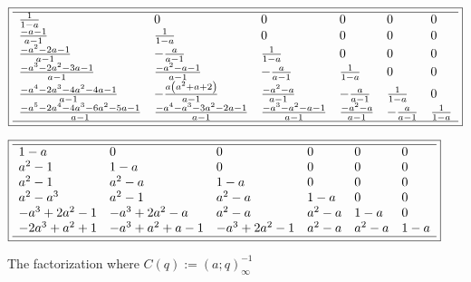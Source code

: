 \documentclass[10pt,reqno]{amsart}
\numberwithin{figure}{section}
\numberwithin{table}{section}
\theoremstyle{plain}
\numberwithin{theorem}{section}
\theoremstyle{remark}
\begin{document}
\begin{figure}[ht!]

\begin{minipage}{\linewidth} 
\begin{center} 
\small
\begin{equation*} 
\boxed{ 
\begin{array}{llllll} \hline 
 \frac{1}{1-a} & 0 & 0 & 0 & 0 & 0 \\
 \frac{-a-1}{a-1} & \frac{1}{1-a} & 0 & 0 & 0 & 0 \\
 \frac{-a^2-2 a-1}{a-1} & -\frac{a}{a-1} & \frac{1}{1-a} & 0 & 0 & 0 \\
 \frac{-a^3-2 a^2-3 a-1}{a-1} & \frac{-a^2-a-1}{a-1} & -\frac{a}{a-1} & \frac{1}{1-a} & 0 & 0 \\
 \frac{-a^4-2 a^3-4 a^2-4 a-1}{a-1} & -\frac{a \left(a^2+a+2\right)}{a-1} & \frac{-a^2-a}{a-1} & -\frac{a}{a-1} & \frac{1}{1-a} & 0 \\
 \frac{-a^5-2 a^4-4 a^3-6 a^2-5 a-1}{a-1} & \frac{-a^4-a^3-3 a^2-2 a-1}{a-1} & \frac{-a^3-a^2-a-1}{a-1} & \frac{-a^2-a}{a-1} & -\frac{a}{a-1} & \frac{1}{1-a} \\
 \hline
\end{array}
}
\end{equation*}
\end{center} 
\end{minipage} 

\begin{minipage}{\linewidth} 
\begin{center} 
\small 
\begin{equation*} 
\boxed{ 
\begin{array}{llllll} \hline 
 1-a & 0 & 0 & 0 & 0 & 0 \\
 a^2-1 & 1-a & 0 & 0 & 0 & 0 \\
 a^2-1 & a^2-a & 1-a & 0 & 0 & 0 \\
 a^2-a^3 & a^2-1 & a^2-a & 1-a & 0 & 0 \\
 -a^3+2 a^2-1 & -a^3+2 a^2-a & a^2-a & a^2-a & 1-a & 0 \\
 -2 a^3+a^2+1 & -a^3+a^2+a-1 & -a^3+2 a^2-1 & a^2-a & a^2-a & 1-a \\
 \hline 
\end{array}
} 
\end{equation*} 
\end{center} 
\end{minipage}

\caption{The factorization where $C(q) := (a; q)_{\infty}^{-1}$} 
\label{figure_factpair_v1} 

\end{figure} 
\end{document}
